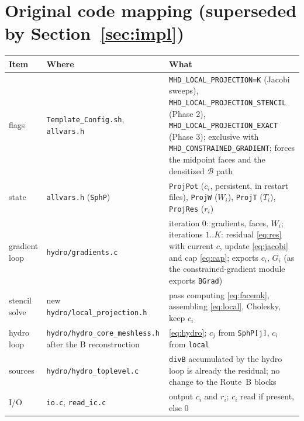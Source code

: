 \documentclass[11pt,a4paper]{article}
\newcommand{\cB}{\mathcal{B}}
\newcommand{\code}[1]{\texttt{#1}}
\begin{document}
\section{Original code mapping (superseded by Section~\ref{sec:impl})}
\begin{center}\small
\begin{tabular}{>{\raggedright\arraybackslash}p{3.4cm}>{\raggedright\arraybackslash}p{5.0cm}>{\raggedright\arraybackslash}p{6.6cm}}
\toprule
Item & Where & What\\
\midrule
flags & \code{Template\_Config.sh}, \code{allvars.h} & \code{MHD\_LOCAL\_PROJECTION=K} (Jacobi sweeps), \code{MHD\_LOCAL\_PROJECTION\_STENCIL} (Phase 2), \code{MHD\_LOCAL\_PROJECTION\_EXACT} (Phase 3); exclusive with \code{MHD\_CONSTRAINED\_GRADIENT}; forces the midpoint faces and the densitized $\cB$ path\\
state & \code{allvars.h} (\code{SphP}) & \code{ProjPot} ($c_i$, persistent, in restart files), \code{ProjW} ($W_i$), \code{ProjT} ($T_i$), \code{ProjRes} ($r_i$)\\
gradient loop & \code{hydro/gradients.c} & iteration 0: gradients, faces, $W_i$; iterations $1..K$: residual \eqref{eq:res} with current $c$, update \eqref{eq:jacobi} and cap \eqref{eq:cap}; exports $c_i$, $G_i$ (as the constrained-gradient module exports \code{BGrad})\\
stencil solve & new \code{hydro/local\_projection.h} & pass computing \eqref{eq:facemk}, assembling \eqref{eq:local}, Cholesky, keep $c_i$\\
hydro loop & \code{hydro/hydro\_core\_meshless.h} after the B reconstruction & \eqref{eq:hydro}; $c_j$ from \code{SphP[j]}, $c_i$ from \code{local}\\
sources & \code{hydro/hydro\_toplevel.c} & \code{divB} accumulated by the hydro loop is already the residual; no change to the Route~B blocks\\
I/O & \code{io.c}, \code{read\_ic.c} & output $c_i$ and $r_i$; $c_i$ read if present, else 0\\
\bottomrule
\end{tabular}
\end{center}

\clearpage
\end{document}
